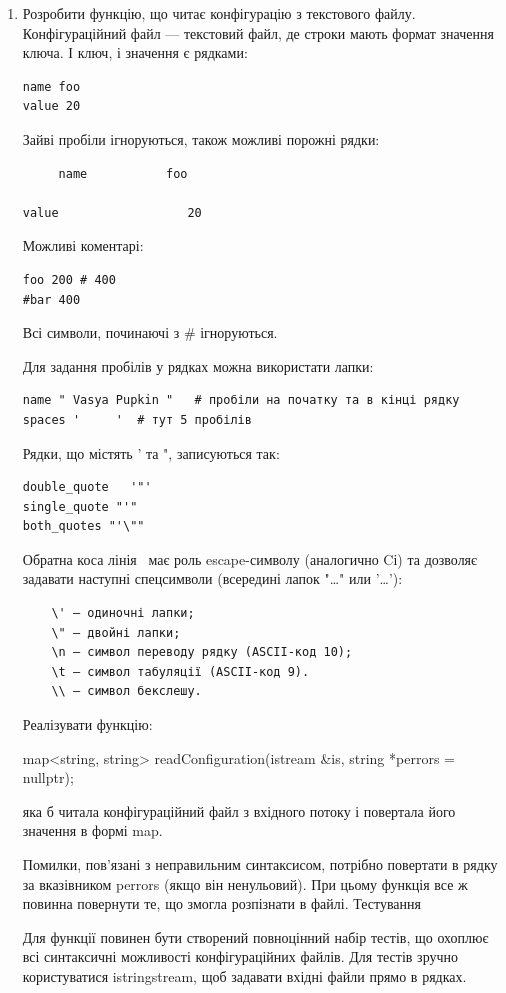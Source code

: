 \documentclass[a5paper,titlepage,openany,twoside,draft]{book_unv}%
\begin{document}
\begin{enumerate}
\def\labelenumi{\arabic{enumi})}
\setcounter{enumi}{20}
\item
Розробити функцію, що читає конфігурацію з текстового файлу.
Конфігураційний файл --- текстовий файл, де строки мають формат значення ключа.
І ключ, і значення є рядками:
\begin{verbatim} 
name foo
value 20
\end{verbatim}
Зайві пробіли ігноруються, також можливі порожні рядки:
\begin{verbatim}
     name           foo

value                  20
\end{verbatim}
Можливі коментарі:
\begin{verbatim}
foo 200 # 400
#bar 400
\end{verbatim}
Всі символи, починаючі з \# ігноруються.

Для задання пробілів у рядках можна використати лапки:
\begin{verbatim}
name " Vasya Pupkin "   # пробіли на початку та в кінці рядку
spaces '     '  # тут 5 пробілів
\end{verbatim}
Рядки, що містять ' та ", записуються так:
\begin{verbatim}
double_quote   '"'
single_quote "'"
both_quotes "'\""
\end{verbatim}
Обратна коса лінія \ має роль escape-символу (аналогично Cі) та дозволяє задавати наступні спецсимволи
 (всередині лапок "…" или '…'):
\begin{verbatim}
    \' – одиночні лапки;
    \" – двойні лапки;
    \n – символ переводу рядку (ASCII-код 10);
    \t – символ табуляції (ASCII-код 9).
    \\ — символ бекслешу.
\end{verbatim}
Реалізувати функцію:

map<string, string> readConfiguration(istream \&is,
                                      string *perrors = nullptr);

яка б читала конфігураційний файл з вхідного потоку і повертала його значення в формі map.

Помилки, пов'язані з неправильним синтаксисом, потрібно повертати в рядку за вказівником perrors (якщо він ненульовий). 
При цьому функція все ж повинна повернути те, що змогла розпізнати в файлі.
Тестування

Для функції повинен бути створений повноцінний набір тестів, що охоплює всі синтаксичні можливості конфігураційних файлів. Для тестів зручно користуватися istringstream, щоб задавати вхідні файли прямо в рядках. 



\end{enumerate}
\end{document}
